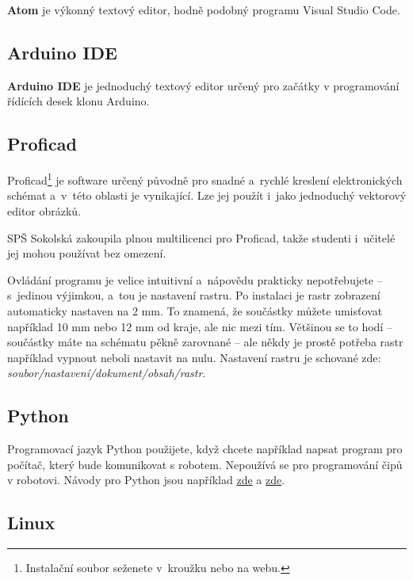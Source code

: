 \textbf{Atom} je výkonný textový editor, hodně podobný programu Visual Studio Code. %

\subsection{Arduino IDE} 

\textbf{Arduino IDE} je jednoduchý textový editor určený pro začátky v programování řídících desek klonu Arduino. %



\subsection{Proficad}

Proficad\footnote{Instalační soubor seženete v~kroužku nebo na webu.} 
je software určený původně pro snadné a~rychlé kreslení elektronických schémat a~v~této oblasti je vynikající. 
Lze jej použít i~jako jednoduchý vektorový editor obrázků. 

SPŠ Sokolská zakoupila plnou multilicenci pro Proficad, takže studenti i~učitelé jej mohou používat bez omezení. 

Ovládání programu je velice intuitivní a~nápovědu prakticky nepotřebujete -- s~jedinou výjimkou, a~tou je nastavení rastru. 
Po instalaci je rastr zobrazení automaticky nastaven na 2 mm. To znamená, že součástky 
můžete umisťovat například 10 mm nebo 12 mm od kraje, ale nic mezi tím. 
Většinou se to hodí -- součástky máte na schématu pěkně zarovnané -- ale 
někdy je prostě potřeba rastr například vypnout neboli nastavit na nulu. 
Nastavení rastru je schované zde:  {\it soubor/nastavení/dokument/obsah/rastr}.

\subsection{Python}

Programovací jazyk Python použijete, když chcete například napsat program pro počítač, který bude komunikovat s robotem. 
Nepoužívá se pro programování čipů v robotovi. 
Návody pro Python jsou například \href{https://www.sallyx.org/sally/python/}{zde} a  \href{http://diveintopython3.py.cz/index.html}{zde}. 


\subsection{Linux} 

